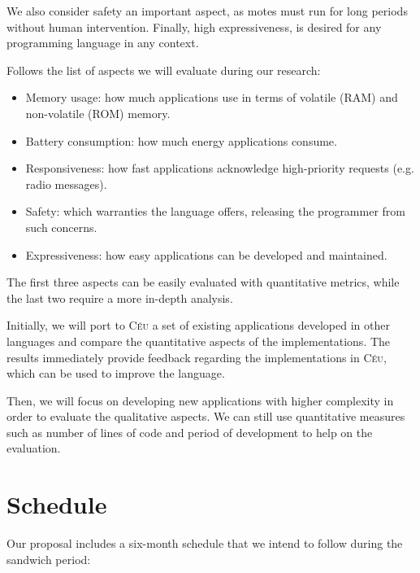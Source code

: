 \documentclass[pdftex,12pt,a4paper]{article}
\newcommand{\CEU}{\textsc{C\'{e}u}}
\begin{document}
We also consider safety an important aspect, as motes must run for long periods 
without human intervention. Finally, high expressiveness, is desired for any 
programming language in any context.

Follows the list of aspects we will evaluate during our research:

\begin{itemize}
\item Memory usage: how much applications use in terms of volatile (RAM) and 
      non-volatile (ROM) memory.
\item Battery consumption: how much energy applications consume.
\item Responsiveness: how fast applications acknowledge high-priority requests 
      (e.g. radio messages).
\item Safety: which warranties the language offers, releasing the programmer 
      from such concerns.
\item Expressiveness: how easy applications can be developed and maintained.
\end{itemize}

The first three aspects can be easily evaluated with quantitative metrics, 
while the last two require a more in-depth
analysis.

Initially, we will port to \CEU{} a set of existing applications developed in 
other languages and compare the quantitative aspects of the implementations.  
The results immediately provide feedback regarding the implementations in 
\CEU{}, which can be used to improve the language.

Then, we will focus on developing new applications with higher complexity in 
order to evaluate the qualitative aspects.
We can still use quantitative measures such as number of lines of code and 
period of development to help on the evaluation.

\section{Schedule}

Our proposal includes a six-month schedule that we intend to follow during the 
sandwich period:
\end{document}
